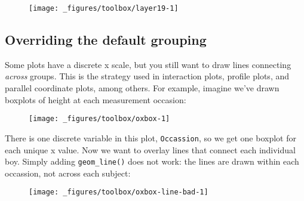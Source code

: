 \begin{figure}[H]
  \centering
  \texttt{[image: \_figures/toolbox/layer19-1]}
\end{figure}

\hypertarget{overriding-the-default-grouping}{%
\subsection{Overriding the default
grouping}\label{overriding-the-default-grouping}}

Some plots have a discrete x scale, but you still want to draw lines
connecting \emph{across} groups. This is the strategy used in
interaction plots, profile plots, and parallel coordinate plots, among
others. For example, imagine we've drawn boxplots of height at each
measurement occasion: 

\begin{Shaded}
\begin{Highlighting}[]
\OperatorTok{+}\StringTok{ }
\StringTok{  }\NormalTok{()}
\end{Highlighting}
\end{Shaded}

\begin{figure}[H]
  \centering
  \texttt{[image: \_figures/toolbox/oxbox-1]}
\end{figure}

There is one discrete variable in this plot, \texttt{Occassion}, so we
get one boxplot for each unique x value. Now we want to overlay lines
that connect each individual boy. Simply adding \texttt{geom\_line()}
does not work: the lines are drawn within each occassion, not across
each subject:

\begin{Shaded}
\begin{Highlighting}[]
\OperatorTok{+}\StringTok{ }
\StringTok{  }\NormalTok{() }\OperatorTok{+}
\StringTok{  }\NormalTok{(} \NormalTok{, } \NormalTok{)}
\end{Highlighting}
\end{Shaded}

\begin{figure}[H]
  \centering
  \texttt{[image: \_figures/toolbox/oxbox-line-bad-1]}
\end{figure}

